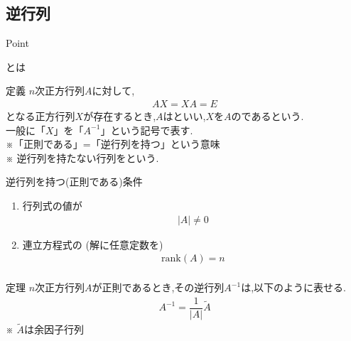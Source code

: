 \documentclass[a4paper]{jsarticle}
\begin{document}
\subsection{逆行列}
\begin{itembox}[l]{Point}
    \begin{center}
        とは
    \end{center}
\end{itembox}
\begin{itembox}[l]{定義}
    $n$次正方行列$A$に対して,
    \begin{eqnarray*}
        AX=XA=E
    \end{eqnarray*}
    となる正方行列$X$が存在するとき,$A$はといい,$X$を$A$のであるという.\\
    一般に「$X$」を「$A^{-1}$」という記号で表す.\\
    ※「正則である」=「逆行列を持つ」という意味\\
    ※ 逆行列を持たない行列をという.
\end{itembox}
\begin{itembox}[l]{逆行列を持つ(正則である)条件}
    \begin{enumerate}[(1)]
        \item 行列式の値が
              \begin{eqnarray*}
                  \left|A\right|\neq0
              \end{eqnarray*}
        \item 連立方程式の (解に任意定数を)
              \begin{eqnarray*}
                  \mathrm{rank}\left(A\right)=n\\
              \end{eqnarray*}
    \end{enumerate}
\end{itembox}
\begin{itembox}[l]{定理}
    $n$次正方行列$A$が正則であるとき,その逆行列$A^{-1}$は,以下のように表せる.
    \begin{eqnarray*}
        A^{-1}=\dfrac{1}{|A|}\tilde{A}
    \end{eqnarray*}
    ※ $\tilde{A}$は余因子行列
\end{itembox}
\\
\end{document}
